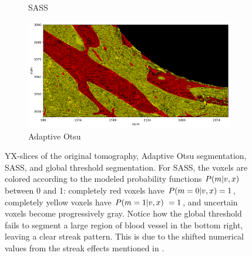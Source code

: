 \begin{figure}
\begin{subfigure}{0.5\textwidth}
      \caption{SASS}
    \end{subfigure}%
    \begin{subfigure}{0.5\textwidth}
      \centering
      \includegraphics[width=\linewidth]{generated/770c_pag_global_yx_otsu.pdf}
      \caption{Adaptive Otsu}
    \end{subfigure}
  \caption{
	  YX-slices of the original tomography, Adaptive Otsu segmentation, SASS,
	  and global threshold segmentation. For SASS, the voxels
	  are colored according to the modeled probability functions $P(m\vert
	  v,x)$ between 0 and 1: completely red voxels have $P(m=0\vert
	  v,x) = 1$, completely yellow voxels have $P(m=1\vert v,x)\ =
	  1$, and uncertain voxels become progressively gray. Notice how the
	  global threshold fails to segment a large region of blood vessel in
	  the bottom right, leaving a clear streak pattern. This is due to the
	  shifted numerical values from the streak effects mentioned in
	  .
    }
    \label{fig:histology-comparison1}
\end{figure}

